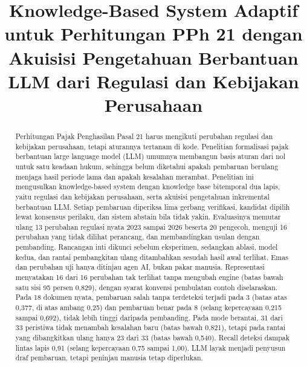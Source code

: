 \documentclass[conference]{IEEEtran}
\makeatletter
\DeclareRobustCommand{\en}[1]{{\usefont{\f@encoding}{\f@family}{\f@series}{it}#1\/}}
\makeatother
\begin{document}

\title{\en{Knowledge-Based System} Adaptif untuk Perhitungan PPh 21 dengan Akuisisi Pengetahuan Berbantuan LLM dari Regulasi dan Kebijakan Perusahaan}

\author{
\and
{}
}

\maketitle

\begin{abstract}
Perhitungan Pajak Penghasilan Pasal 21 harus mengikuti perubahan regulasi dan kebijakan perusahaan, tetapi aturannya tertanam di kode. Penelitian formalisasi pajak berbantuan \en{large language model} (LLM) umumnya membangun basis aturan dari nol untuk satu keadaan hukum, sehingga belum diketahui apakah pembaruan berulang menjaga hasil periode lama dan apakah kesalahan merambat. Penelitian ini mengusulkan \en{knowledge-based system} dengan \en{knowledge base} bitemporal dua lapis, yaitu regulasi dan kebijakan perusahaan, serta akuisisi pengetahuan inkremental berbantuan LLM. Setiap pembaruan diperiksa lima gerbang verifikasi, kandidat dipilih lewat konsensus perilaku, dan sistem \en{abstain} bila tidak yakin. Evaluasinya memutar ulang 13 perubahan regulasi nyata 2023 sampai 2026 beserta 20 pengecoh, menguji 16 perubahan yang tidak dilihat perancang, dan membandingkan usulan dengan pembanding. Rancangan inti dikunci sebelum eksperimen, sedangkan ablasi, model kedua, dan rantai pembangkitan ulang ditambahkan sesudah hasil awal terlihat. Emas dan perubahan uji hanya ditinjau agen AI, bukan pakar manusia. Representasi menyatakan 16 dari 16 perubahan tak terlihat tanpa mengubah \en{engine} (batas bawah satu sisi 95 persen 0,829), dengan syarat konvensi pembulatan contoh diselaraskan. Pada 18 dokumen nyata, pembaruan salah tanpa terdeteksi terjadi pada 3 (batas atas 0,377, di atas ambang 0,25) dan pembaruan benar pada 8 (selang kepercayaan 0,215 sampai 0,692), tidak lebih tinggi daripada pembanding. Pada mode berantai, 31 dari 33 peristiwa tidak menambah kesalahan baru (batas bawah 0,821), tetapi pada rantai yang dibangkitkan ulang hanya 23 dari 33 (batas bawah 0,540). \en{Recall} deteksi dampak lintas lapis 0,91 (selang kepercayaan 0,75 sampai 1,00). LLM layak menjadi penyusun draf pembaruan, tetapi peninjau manusia tetap diperlukan.
\end{abstract}
\end{document}
